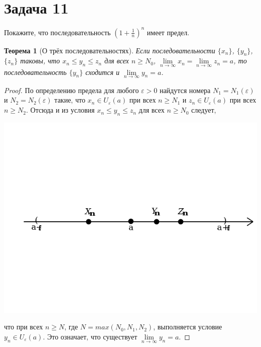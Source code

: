 \documentclass[a4paper,12pt]{article}
\newtheorem*{ther}{Теорема}
\newcommand{\eps}{\varepsilon}
\begin{document}
    \section*{Задача 11}

    Покажите, что последовательность $(1 + \frac{1}{n})^n$ имеет предел.

    \begin{ther}[О трёх последовательностях]
        Если последовательности 
        $\{ x_{n}\}$, $ \{ y_{n} \} $, $ \{ z_{n} \}$
        таковы, что  $x_{n} \leq y_{n} \leq z_{n}$ для всех 
        $n \geq N_{0}$,  $\lim\limits_{n\to \infty }x_{n}=\lim\limits_{n\to \infty }z_{n}=a$, то последовательность  $ \{ y_{n} \}$ сходится и  $\lim\limits_{n\to \infty }y_{n}=a$.
    \end{ther}

    \begin{proof}
        По определению предела для любого $\eps > 0$ найдутся номера $N_{1}=N_{1}(\eps)$ и  $N_{2}=N_{2}(\eps)$ такие, что  $x_{n}\in U_{\eps }(a)$ при всех  $n\geq N_{1}$ и  $z_{n}\in U_{\eps }(a)$ при всех  $n\geq N_{2}$. Отсюда и из условия $x_{n}\leq y_{n}\leq z_{n}$ для всех  $n \geq N_{0}$  следует,
        \begin{center}\includegraphics[scale=0.4]{1.png}\end{center}
        что при всех  $n\geq N$,  где $N = max \left ( N_{0},N_{1},N_{2} \right )$, выполняется условие  $y_{n}\in U_{\varepsilon }(a)$. Это означает, что существует  $\lim\limits_{n\rightarrow \infty }y_{n}=a$.
    \end{proof}
\end{document}
